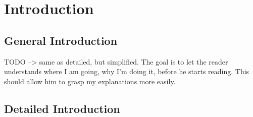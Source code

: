 \section{Introduction}





\subsection{General Introduction}
TODO --> same as detailed, but simplified.
The goal is to let the reader understands where I am going, why I'm doing
it, before he starts reading. This should allow him to grasp my explanations
more easily.


\subsection{Detailed Introduction}

